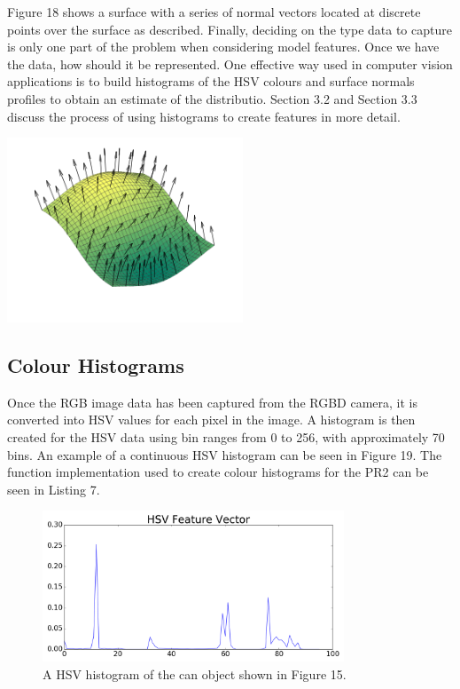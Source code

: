 \documentclass[a4paper]{article}
\begin{document}
\begin{minipage}{0.45\textwidth}
Figure 18 shows a surface with a series of normal vectors located at discrete points over the surface as described. Finally, deciding on the type data to capture is only one part of the problem when considering model features. Once we have the data, how should it be represented. One effective way used in computer vision applications is to build histograms of the HSV colours and surface normals profiles to obtain an estimate of the distributio. Section 3.2 and Section 3.3 discuss the process of using histograms to create features in more detail.
\end{minipage}
	\hspace{1cm}
\begin{minipage}{0.45\textwidth}
	\centering
	\includegraphics[height=5.5cm]{surface_normals}
\end{minipage}


\subsection{Colour Histograms}
Once the RGB image data has been captured from the RGBD camera, it is converted into HSV values for each pixel in the image. A histogram is then created for the HSV data using bin ranges from 0 to 256, with approximately 70 bins. An example of a continuous HSV histogram can be seen in Figure 19. The function implementation used to create colour histograms for the PR2 can be seen in Listing 7.
\begin{figure}[h]
	\centering
	\includegraphics[height=4.5cm]{hsv_histo}
	\caption{A HSV histogram of the can object shown in Figure 15.}
\end{figure}
\end{document}
